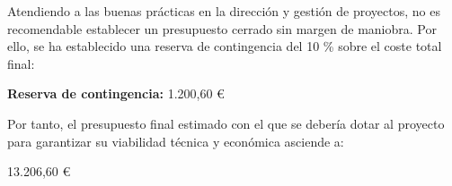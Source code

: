 Atendiendo a las buenas prácticas en la dirección y gestión de proyectos, no es recomendable establecer un presupuesto cerrado sin margen de maniobra. Por ello, se ha establecido una reserva de contingencia del 10 \% sobre el coste total final:

\textbf{Reserva de contingencia:} 1.200,60 €

Por tanto, el presupuesto final estimado con el que se debería dotar al proyecto para garantizar su viabilidad técnica y económica asciende a:

\begin{center}
\Large 13.206,60 €
\end{center}

